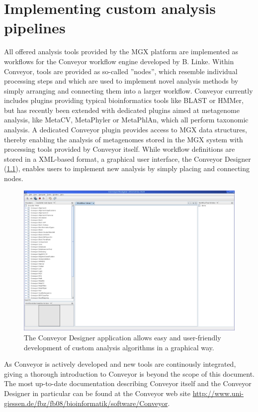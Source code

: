 
\chapter{Implementing custom analysis pipelines}
\label{custom}

All offered analysis tools provided by the MGX platform are implemented as workflows
for the Conveyor \cite{CONVEYOR} workflow engine developed by B. Linke. Within Conveyor,
tools are provided as so-called ''nodes'', which resemble individual processing steps
and which are used to implement novel analysis methods by simply arranging and connecting
them into a larger workflow. Conveyor currently includes plugins providing typical
bioinformatics tools like BLAST or HMMer, but has recently been extended with dedicated
plugins aimed at metagenome analysis, like MetaCV, MetaPhyler or MetaPhlAn, which all
perform taxonomic analysis.
A dedicated Conveyor plugin provides access to MGX data structures, thereby enabling the
analysis of metagenomes stored in the MGX system with processing tools provided by Conveyor
itself.
While workflow definitions are stored in a XML-based format, a graphical user interface,
the Conveyor Designer (\ref{designer}), enables users to implement new analysis by simply
placing and connecting nodes.

\begin{figure}[H]
\includegraphics[width=\textwidth]{img/conveyor/designer}
\caption[Conveyor Designer]{The Conveyor Designer application allows easy and user-friendly
development of custom analysis algorithms in a graphical way.}
\label{designer}
\end{figure}

As Conveyor is actively developed and new tools are continously integrated, giving a thorough
introduction to Conveyor is beyond the scope of this document. The most up-to-date documentation describing
Conveyor itself and the Conveyor Designer in particular can be found at the Conveyor web
site \url{http://www.uni-giessen.de/fbz/fb08/bioinformatik/software/Conveyor}. 

